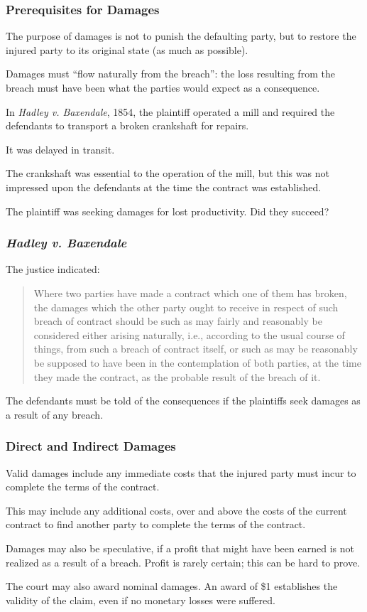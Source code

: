 \begin{frame}
\frametitle{Prerequisites for Damages}

The purpose of damages is not to punish the defaulting party, but to restore the injured party to its original state (as much as possible).

Damages must ``flow naturally from the breach'': the loss resulting from the breach must have been what the parties would expect as a consequence.


In \textit{Hadley v. Baxendale}, 1854, the plaintiff operated a mill and required the defendants to transport a broken crankshaft for repairs.

It was delayed in transit.

The crankshaft was essential to the operation of the mill, but this was not impressed upon the defendants at the time the contract was established.

The plaintiff was seeking damages for lost productivity. Did they succeed?

\end{frame}



\begin{frame}
\frametitle{\textit{Hadley v. Baxendale}}

The justice indicated:

\begin{quote}
Where two parties have made a contract which one of them has broken, the damages which the other party ought to receive in respect of such breach of contract should be such as may fairly and reasonably be considered either arising naturally, i.e., according to the usual course of things, from such a breach of contract itself, or such as may be reasonably be supposed to have been in the contemplation of both parties, at the time they made the contract, as the probable result of the breach of it.
\end{quote}

The defendants must be told of the consequences if the plaintiffs seek damages as a result of any breach. 

\end{frame}



\begin{frame}
\frametitle{Direct and Indirect Damages}

Valid damages include any immediate costs that the injured party must incur to complete the terms of the contract.

This may include any additional costs, over and above the costs of the current contract to find another party to complete the terms of the contract.

Damages may also be speculative, if a profit that might have been earned is not realized as a result of a breach. Profit is rarely certain; this can be hard to prove.

The court may also award \alert{nominal damages}. An award of \$1 establishes the validity of the claim, even if no monetary losses were suffered.

\end{frame}



